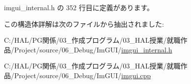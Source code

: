  imgui\+\_\+internal.\+h の 352 行目に定義があります。



この構造体詳解は次のファイルから抽出されました\+:\begin{DoxyCompactItemize}
\item 
C\+:/\+H\+A\+L/\+P\+G関係/03\+\_\+作成プログラム/03\+\_\+\+H\+A\+L授業/就職作品/\+Project/source/06\+\_\+\+Debug/\+Im\+G\+U\+I/\mbox{\hyperlink{imgui__internal_8h}{imgui\+\_\+internal.\+h}}\item 
C\+:/\+H\+A\+L/\+P\+G関係/03\+\_\+作成プログラム/03\+\_\+\+H\+A\+L授業/就職作品/\+Project/source/06\+\_\+\+Debug/\+Im\+G\+U\+I/\mbox{\hyperlink{imgui_8cpp}{imgui.\+cpp}}\end{DoxyCompactItemize}
